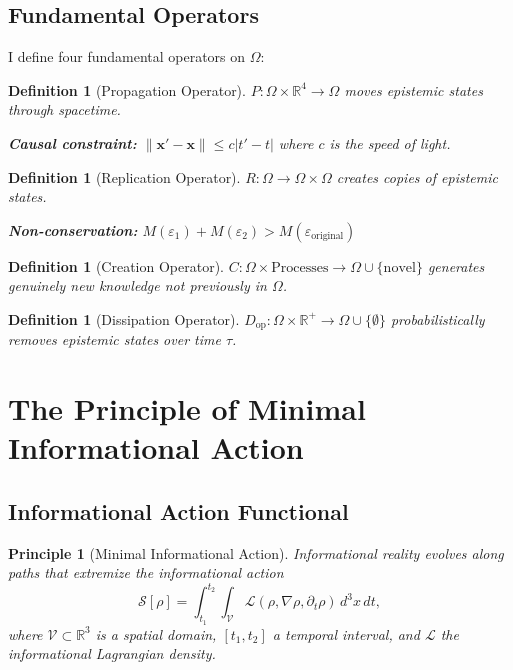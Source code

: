 \documentclass[12pt]{article}
\newtheorem{definition}[theorem]{Definition}
\newtheorem{principle}{Principle}
\begin{document}
\subsection{Fundamental Operators}

I define four fundamental operators on $\Omega$:

\begin{definition}[Propagation Operator]
$P: \Omega \times \mathbb{R}^4 \to \Omega$ moves epistemic states through spacetime.

\textbf{Causal constraint:} $\|\mathbf{x}' - \mathbf{x}\| \leq c|t' - t|$ where $c$ is the speed of light.
\end{definition}

\begin{definition}[Replication Operator]
$R: \Omega \to \Omega \times \Omega$ creates copies of epistemic states.

\textbf{Non-conservation:} $M(\varepsilon_1) + M(\varepsilon_2) > M(\varepsilon_{\text{original}})$
\end{definition}

\begin{definition}[Creation Operator]
$C: \Omega \times \text{Processes} \to \Omega \cup \{\text{novel}\}$ generates genuinely new knowledge not previously in $\Omega$.
\end{definition}

\begin{definition}[Dissipation Operator]
$D_{\text{op}}: \Omega \times \mathbb{R}^+ \to \Omega \cup \{\emptyset\}$ probabilistically removes epistemic states over time $\tau$.
\end{definition}

\section{The Principle of Minimal Informational Action}

\subsection{Informational Action Functional}

\begin{principle}[Minimal Informational Action]
\label{prin:action}
Informational reality evolves along paths that extremize the \emph{informational action}
\begin{equation}
    \mathcal{S}[\rho] = \int_{t_1}^{t_2} \int_{\mathcal{V}} \mathcal{L}(\rho, \nabla \rho, \partial_t \rho)\, d^3x\, dt,
    \label{eq:action}
\end{equation}
where $\mathcal{V} \subset \mathbb{R}^3$ is a spatial domain, $[t_1, t_2]$ a temporal interval, and $\mathcal{L}$ the \emph{informational Lagrangian density}.
\end{principle}
\end{document}
